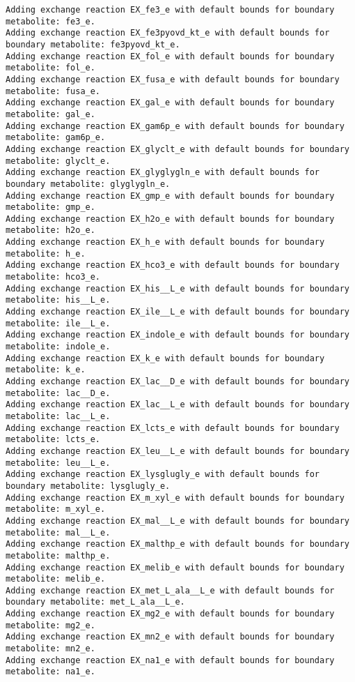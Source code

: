 \documentclass[
  letterpaper,
  DIV=11,
  numbers=noendperiod]{scrartcl}
\begin{document}
\begin{verbatim}
Adding exchange reaction EX_fe3_e with default bounds for boundary metabolite: fe3_e.
Adding exchange reaction EX_fe3pyovd_kt_e with default bounds for boundary metabolite: fe3pyovd_kt_e.
Adding exchange reaction EX_fol_e with default bounds for boundary metabolite: fol_e.
Adding exchange reaction EX_fusa_e with default bounds for boundary metabolite: fusa_e.
Adding exchange reaction EX_gal_e with default bounds for boundary metabolite: gal_e.
Adding exchange reaction EX_gam6p_e with default bounds for boundary metabolite: gam6p_e.
Adding exchange reaction EX_glyclt_e with default bounds for boundary metabolite: glyclt_e.
Adding exchange reaction EX_glyglygln_e with default bounds for boundary metabolite: glyglygln_e.
Adding exchange reaction EX_gmp_e with default bounds for boundary metabolite: gmp_e.
Adding exchange reaction EX_h2o_e with default bounds for boundary metabolite: h2o_e.
Adding exchange reaction EX_h_e with default bounds for boundary metabolite: h_e.
Adding exchange reaction EX_hco3_e with default bounds for boundary metabolite: hco3_e.
Adding exchange reaction EX_his__L_e with default bounds for boundary metabolite: his__L_e.
Adding exchange reaction EX_ile__L_e with default bounds for boundary metabolite: ile__L_e.
Adding exchange reaction EX_indole_e with default bounds for boundary metabolite: indole_e.
Adding exchange reaction EX_k_e with default bounds for boundary metabolite: k_e.
Adding exchange reaction EX_lac__D_e with default bounds for boundary metabolite: lac__D_e.
Adding exchange reaction EX_lac__L_e with default bounds for boundary metabolite: lac__L_e.
Adding exchange reaction EX_lcts_e with default bounds for boundary metabolite: lcts_e.
Adding exchange reaction EX_leu__L_e with default bounds for boundary metabolite: leu__L_e.
Adding exchange reaction EX_lysglugly_e with default bounds for boundary metabolite: lysglugly_e.
Adding exchange reaction EX_m_xyl_e with default bounds for boundary metabolite: m_xyl_e.
Adding exchange reaction EX_mal__L_e with default bounds for boundary metabolite: mal__L_e.
Adding exchange reaction EX_malthp_e with default bounds for boundary metabolite: malthp_e.
Adding exchange reaction EX_melib_e with default bounds for boundary metabolite: melib_e.
Adding exchange reaction EX_met_L_ala__L_e with default bounds for boundary metabolite: met_L_ala__L_e.
Adding exchange reaction EX_mg2_e with default bounds for boundary metabolite: mg2_e.
Adding exchange reaction EX_mn2_e with default bounds for boundary metabolite: mn2_e.
Adding exchange reaction EX_na1_e with default bounds for boundary metabolite: na1_e.

\end{verbatim}
\end{document}

